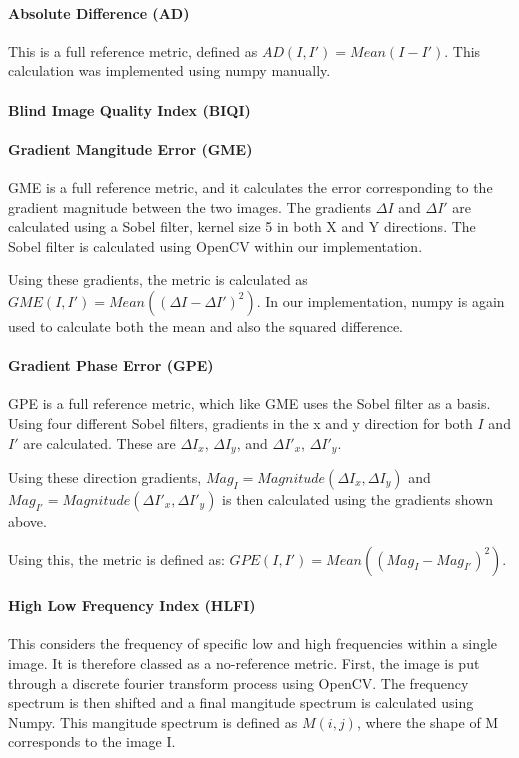 \documentclass[11pt,a4paper]{article}
\begin{document}
            \paragraph{Absolute Difference (AD)}
                This is a full reference metric, defined as $AD(I, I') = Mean(I - I')$. This calculation was implemented using numpy manually.
            \paragraph{Blind Image Quality Index (BIQI)}
            \paragraph{Gradient Mangitude Error (GME)}
                GME is a full reference metric, and it calculates the error corresponding to the gradient magnitude between the two images. The gradients $\Delta I$ and $\Delta I'$
                are calculated using a Sobel filter, kernel size 5 in both X and Y directions. The Sobel filter is calculated using OpenCV within our implementation.

                Using these gradients, the metric is calculated as $GME(I, I') = Mean((\Delta I - \Delta I')^2)$. In our implementation, numpy is again used to calculate both the mean and
                also the squared difference.

            \paragraph{Gradient Phase Error (GPE)}
                GPE is a full reference metric, which like GME uses the Sobel filter as a basis. Using four different Sobel filters, gradients in the x and y direction for both
                $I$ and $I'$ are calculated. These are $\Delta I_x$, $\Delta I_y$, and $\Delta I'_x$, $\Delta I'_y$.

                Using these direction gradients, $Mag_{I} = Magnitude(\Delta I_x, \Delta I_y)$ and $Mag_{I'} = Magnitude(\Delta I'_x, \Delta I'_y)$ is then calculated using the gradients shown above.

                Using this, the metric is defined as: $GPE(I, I') = Mean((Mag_{I} - Mag_{I'})^2)$.

            \paragraph{High Low Frequency Index (HLFI)}
                This considers the frequency of specific low and high frequencies within a single image. It is therefore classed as a no-reference metric.
                First, the image is put through a discrete fourier transform process using OpenCV. The frequency spectrum is then shifted and a final mangitude spectrum
                is calculated using Numpy. This mangitude spectrum is defined as $M(i, j)$, where the shape of M corresponds to the image I.
\end{document}
